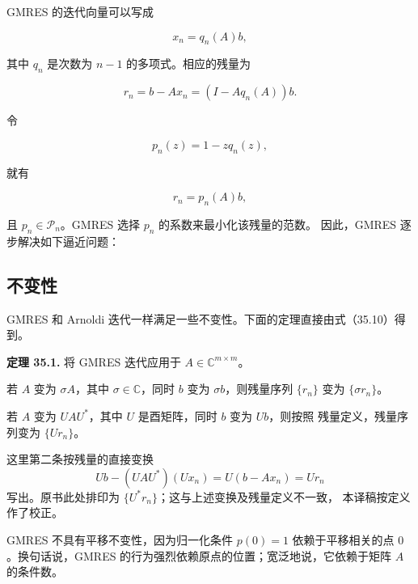 \documentclass[UTF8,fontset=none,12pt]{ctexart}
\begin{document}
GMRES 的迭代向量可以写成

\begin{equation}
x_n=q_n(A)b,
\tag{35.8}
\end{equation}

其中 $q_n$ 是次数为 $n-1$ 的多项式。相应的残量为

\[
r_n=b-Ax_n
=(I-Aq_n(A))b.
\]

令

\[
p_n(z)=1-zq_n(z),
\]

就有

\begin{equation}
r_n=p_n(A)b,
\tag{35.9}
\end{equation}

且 $p_n\in\mathcal P_n$。GMRES 选择 $p_n$ 的系数来最小化该残量的范数。
因此，GMRES 逐步解决如下逼近问题：

\begin{center}
\end{center}

\subsection*{不变性}

GMRES 和 Arnoldi 迭代一样满足一些不变性。下面的定理直接由式（35.10）得到。

\textbf{定理 35.1.}
将 GMRES 迭代应用于 $A\in\mathbb C^{m\times m}$。

\begin{description}[leftmargin=3.55cm,style=sameline]
\item[尺度不变性]
若 $A$ 变为 $\sigma A$，其中 $\sigma\in\mathbb C$，同时 $b$ 变为
$\sigma b$，则残量序列 $\{r_n\}$ 变为 $\{\sigma r_n\}$。

\item[酉相似变换下的不变性]
若 $A$ 变为 $UAU^*$，其中 $U$ 是酉矩阵，同时 $b$ 变为 $Ub$，则按照
残量定义，残量序列变为 $\{Ur_n\}$。
\end{description}

这里第二条按残量的直接变换
\[
Ub-(UAU^*)(Ux_n)=U(b-Ax_n)=Ur_n
\]
写出。原书此处排印为 $\{U^*r_n\}$；这与上述变换及残量定义不一致，
本译稿按定义作了校正。

GMRES 不具有平移不变性，因为归一化条件 $p(0)=1$ 依赖于平移相关的点
$0$。换句话说，GMRES 的行为强烈依赖原点的位置；宽泛地说，它依赖于矩阵
$A$ 的条件数。
\end{document}
